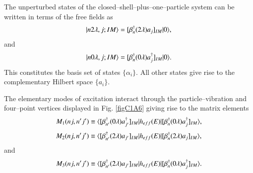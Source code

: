 The unperturbed states of the closed--shell--plus--one--particle system can be written in terms of the free fields as 
  \begin{align}\label{eqC1A81} 
   |{n2\lambda,j;IM} \rangle=[\beta^\dagger_n(2\lambda)a_j]_{IM}|{0} \rangle,
    \end{align}  
and 
  \begin{align}\label{eqC1A82} 
   |{n0\lambda,j;IM} \rangle=[\beta^\dagger_n(0\lambda)a^\dagger_j]_{IM}|{0} \rangle.
    \end{align}   
This constitutes the basis set of states $\{\alpha_i\}$. All other states give rise to the complementary Hilbert space $\{a_i\}$. 


The elementary modes of excitation interact through the particle--vibration and four--point vertices displayed in Fig. \ref{figC1A6} giving rise to the matrix elements 
  \begin{align}\label{eqC1A83} 
   M_1(nj,n'j')\equiv \langle {[\beta^\dagger_{n'}(0\lambda)a^\dagger_{j'}]_{IM}|h_{eff}(E)|[\beta^\dagger_n(0\lambda)a^\dagger_j]_{IM}} \rangle,
    \end{align}   
  \begin{align}\label{eqC1A84} 
   M_2(nj,n'j')\equiv \langle {[\beta^\dagger_{n'}(2\lambda)a_{j'}]_{IM}|h_{eff}(E)|[\beta^\dagger_n(2\lambda)a_j]_{IM}} \rangle,
    \end{align}    
and 
  \begin{align}\label{eqC1A85} 
   M_3(nj,n'j')\equiv \langle {[\beta^\dagger_{n'}(2\lambda)a_{j'}]_{IM}|h_{eff}(E)|[\beta^\dagger_{n}(0\lambda)a^\dagger_j]_{IM}} \rangle.
    \end{align}   
